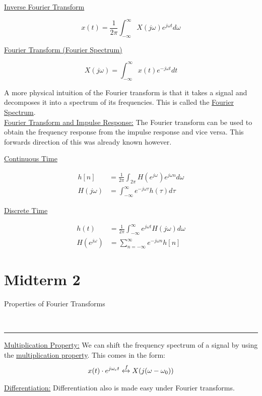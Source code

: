 \documentclass{article}
\newcommand{\sheader}[1]{\underline{#1:}}
\newcommand{\header}[1]{\begin{large}\noindent #1\end{large}\\\rule{\textwidth}{0.5pt}}
\newcommand{\gap}{\medskip\\}
\newcommand{\centertext}[1]{\begin{center}#1\end{center}}
\newcommand{\jomega}{{j\omega}}
\newcommand{\domega}{d\omega}
\begin{document}
\begin{multicols}{2}
    \centertext{\underline{Inverse Fourier Transform}}
    \[
        x(t) = \frac{1}{2\pi}\int_{-\infty}^\infty X(j\omega)e^{j\omega t}{d}\omega
    \]
    \vfill\null\columnbreak
    \centertext{\underline{Fourier Transform (Fourier Spectrum)}}
    \[
        X(\jomega) = \int_{-\infty}^\infty x(t)e^{-\jomega t}{d}t  
    \]
    \vfill\null
\end{multicols}
A more physical intuition of the Fourier transform is that it takes
a signal and decomposes it into a spectrum of its frequencies. This
is called the \underline{Fourier Spectrum}.
\gap
\underline{Fourier Transform and Impulse Response:} The Fourier
transform can be used to obtain the frequency response from the impulse response
and vice versa. This forwards direction of this was already known however.

\begin{multicols}{2}
    \centertext{\underline{Continuous Time}}
    \begin{align*}
        h[n] &= \frac{1}{2\pi}\int_{2\pi}H(e^\jomega)e^{\jomega n} \domega\\
        H(\jomega) &= \int_{-\infty}^\infty e^{-\jomega \tau}h(\tau)d\tau
    \end{align*}
    \vfill\null\columnbreak
    \centertext{\underline{Discrete Time}}
    \begin{align*}
        h(t) &= \frac{1}{2\pi}\int_{-\infty}^\infty e^{j\omega t}H(\jomega)\domega \\ 
        H(e^{\jomega}) &= \sum_{n = -\infty}^\infty e^{-\jomega n }h[n]
    \end{align*}
    \vfill\null
\end{multicols}

\pagebreak

\section*{Midterm 2}

\header{Properties of Fourier Transforms}

\sheader{Multiplication Property} We can shift the frequency spectrum of a signal by using the \underline{multiplication property}.
This comes in the form:
\begin{align*}
    x(t) \cdot e^{j\omega_c t} \xleftrightarrow[]{f}  X(j(\omega - \omega_0))
\end{align*}

\sheader{Differentiation} Differentiation also is made easy under 
Fourier transforms.
\end{document}
